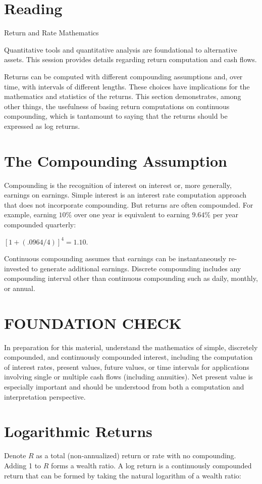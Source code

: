 \documentclass[11pt]{article}
\begin{document}
\section*{Reading}
Return and Rate Mathematics

Quantitative tools and quantitative analysis are foundational to alternative assets. This session provides details regarding return computation and cash flows.

Returns can be computed with different compounding assumptions and, over time, with intervals of different lengths. These choices have implications for the mathematics and statistics of the returns. This section demonstrates, among other things, the usefulness of basing return computations on continuous compounding, which is tantamount to saying that the returns should be expressed as log returns.

\section*{The Compounding Assumption}
Compounding is the recognition of interest on interest or, more generally, earnings on earnings. Simple interest is an interest rate computation approach that does not incorporate compounding. But returns are often compounded. For example, earning $10 \%$ over one year is equivalent to earning $9.64 \%$ per year compounded quarterly:

$[1+(.0964 / 4)]^{4}=1.10$.

Continuous compounding assumes that earnings can be instantaneously re-invested to generate additional earnings. Discrete compounding includes any compounding interval other than continuous compounding such as daily, monthly, or annual.

\section*{FOUNDATION CHECK}
In preparation for this material, understand the mathematics of simple, discretely compounded, and continuously compounded interest, including the computation of interest rates, present values, future values, or time intervals for applications involving single or multiple cash flows (including annuities). Net present value is especially important and should be understood from both a computation and interpretation perspective.

\section*{Logarithmic Returns}
Denote $R$ as a total (non-annualized) return or rate with no compounding. Adding 1 to $R$ forms a wealth ratio. A log return is a continuously compounded return that can be formed by taking the natural logarithm of a wealth ratio:
\end{document}
